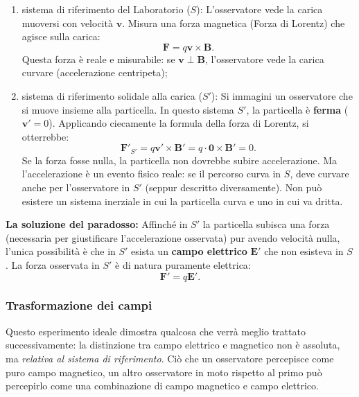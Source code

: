 \documentclass[a4paper,11pt]{report}
\begin{document}
\begin{enumerate}
    \item {sistema di riferimento del Laboratorio ($S$):}
    L'osservatore vede la carica muoversi con velocità $\bm{v}$. Misura una forza magnetica (Forza di Lorentz) che agisce sulla carica:
    \begin{equation}
        \bm{F} = q \bm{v} \times \bm{B}.
    \end{equation}
    Questa forza è reale e misurabile: se $\bm{v} \perp \bm{B}$, l'osservatore vede la carica curvare (accelerazione centripeta);

    \item {sistema di riferimento solidale alla carica ($S'$):}
    Si immagini un osservatore che si muove insieme alla particella. In questo sistema $S'$, la particella è \textbf{ferma} ($\bm{v}' = 0$).
    Applicando ciecamente la formula della forza di Lorentz, si otterrebbe:
    \begin{equation}
        \bm{F}'_{S'} = q \bm{v}' \times \bm{B}' = q \cdot \bm{0} \times \bm{B}' = 0.
    \end{equation}
    Se la forza fosse nulla, la particella non dovrebbe subire accelerazione. Ma l'accelerazione è un evento fisico reale: se il percorso curva in $S$, deve curvare anche per l'osservatore in $S'$ (seppur descritto diversamente). Non può esistere un sistema inerziale in cui la particella curva e uno in cui va dritta.
\end{enumerate}
\textbf{La soluzione del paradosso:}
Affinché in $S'$ la particella subisca una forza (necessaria per giustificare l'accelerazione osservata) pur avendo velocità nulla, l'unica possibilità è che in $S'$ esista un \textbf{campo elettrico} $\bm{E}'$ che non esisteva in $S$.
La forza osservata in $S'$ è di natura puramente elettrica:
\begin{equation}
    \bm{F}' = q \bm{E}'.
\end{equation}

\subsubsection{Trasformazione dei campi}
Questo esperimento ideale dimostra qualcosa che verrà meglio trattato successivamente: la distinzione tra campo elettrico e magnetico non è assoluta, ma \textit{relativa al sistema di riferimento}.
Ciò che un osservatore percepisce come puro campo magnetico, un altro osservatore in moto rispetto al primo può percepirlo come una combinazione di campo magnetico e campo elettrico.
\end{document}
